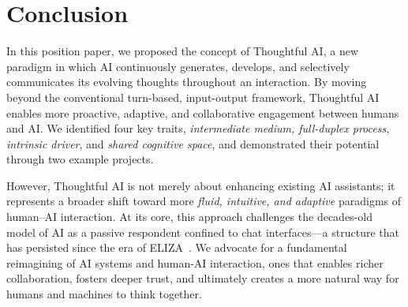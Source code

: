 \section{Conclusion}
In this position paper, we proposed the concept of Thoughtful AI, a new paradigm in which AI continuously generates, develops, and selectively communicates its evolving thoughts throughout an interaction. By moving beyond the conventional turn-based, input-output framework, Thoughtful AI enables more proactive, adaptive, and collaborative engagement between humans and AI. We identified four key traits, \textit{intermediate medium, full-duplex process, intrinsic driver}, and \textit{shared cognitive space}, and demonstrated their potential through two example projects.

However, Thoughtful AI is not merely about enhancing existing AI assistants; it represents a broader shift toward more \textit{fluid, intuitive, and adaptive} paradigms of human–AI interaction. At its core, this approach challenges the decades-old model of AI as a passive respondent confined to chat interfaces---a structure that has persisted since the era of ELIZA~\cite{Weizenbaum1966ELIZAaCP}. 
We advocate for a fundamental reimagining of AI systems and human-AI interaction, ones that enables richer collaboration, fosters deeper trust, and ultimately creates a more natural way for humans and machines to think together.